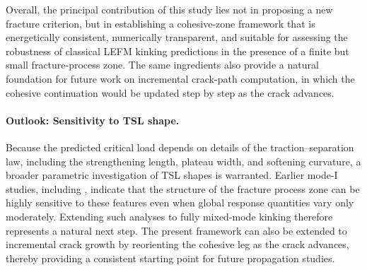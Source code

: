 \documentclass[smallextended]{svjour3}       %
\begin{document}
Overall, the principal contribution of this study lies not in proposing a
new fracture criterion, but in establishing a cohesive-zone framework that
is energetically consistent, numerically transparent, and suitable for
assessing the robustness of classical LEFM kinking predictions in the
presence of a finite but small fracture-process zone. The same ingredients
also provide a natural foundation for future work on incremental
crack-path computation, in which the cohesive continuation would be updated
step by step as the crack advances.

\paragraph{Outlook: Sensitivity to TSL shape.}
Because the predicted critical load depends on details of the
traction--separation law, including the strengthening length, plateau width,
and softening curvature, a broader parametric investigation of TSL shapes is
warranted. Earlier mode-I studies, including
\cite{Selivanov2019ModeI}, indicate that the structure of the fracture
process zone can be highly sensitive to these features even when global
response quantities vary only moderately. Extending such analyses to fully
mixed-mode kinking therefore represents a natural next step. The present
framework can also be extended to incremental crack growth by reorienting
the cohesive leg as the crack advances, thereby providing a consistent
starting point for future propagation studies.




\printbibliography
\end{document}
